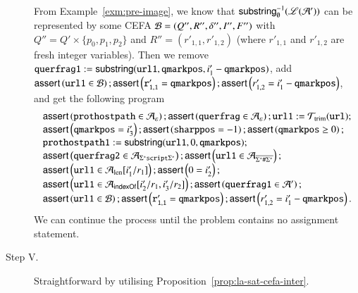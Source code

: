 \begin{example}
\begin{description}
From Example~\ref{exm:pre-image}, we know that $\mathsf{substring}^{-1}_\emptyset(\mathscr{L}(\mathcal{A}'))$ can be represented by some CEFA $\mathcal{B}=(Q'', R'', \delta'', I'', F'')$ with $Q''= Q' \times \{p_0,p_1,p_2\}$ and $R''=(r'_{1,1}, r'_{1,2})$ (where $r'_{1,1}$ and $r'_{1,2}$ are fresh integer variables). Then we remove $\mathtt{querfrag1} := \mathsf{substring}(\mathtt{url1, qmarkpos}, i'_1 - \mathtt{qmarkpos})$, add $\textsf{assert}\left(\mathtt{url1} \in \mathcal{B}\right);\textsf{assert}\left(\mathtt{r'_{1,1}= qmarkpos}\right); \textsf{assert}\left(r'_{1,2}=i'_1 - \mathtt{qmarkpos}\right)$, and get the following program
\[ 
\begin{array}{l}
    \textsf{assert}\left(\mathtt{prothostpath} \in \mathcal{A}_\varepsilon\right); \textsf{assert}\left(\mathtt{querfrag} \in \mathcal{A}_\varepsilon\right); \mathtt{url1} := \mathcal{T}_{\rm trim}(\mathtt{url}); \\
    \textsf{assert}\left(\mathtt{qmarkpos} = i'_3\right); \textsf{assert}\left(\mathtt{sharppos} =-1 \right); \textsf{assert}\left(\mathtt{qmarkpos} \ge 0\right); \\ 
    \mathtt{prothostpath1} := \mathsf{substring}(\mathtt{url1}, 0, \mathtt{qmarkpos});\\
    \textsf{assert}\left(\mathtt{querfrag2} \in  \mathcal{A}_{\Sigma^*\mathtt{script}\Sigma^*}\right);  
    \textsf{assert}\left(\mathtt{url1} \in  \mathcal{A}_{\overline{\Sigma^*\#\Sigma^*}}\right); \\
    \textsf{assert}\left(\mathtt{url1} \in \mathcal{A}_{\rm len}[i'_1/r_1]\right);  \textsf{assert}\left(0= i'_2\right); \\
    \textsf{assert}\left(\mathtt{url1} \in \mathcal{A}_{\mathsf{indexOf}}[i'_2/r_1, i'_3/r_2]\right);  \textsf{assert}\left(\mathtt{querfrag1} \in \mathcal{A}'\right);\\
    \textsf{assert}\left(\mathtt{url1} \in \mathcal{B}\right);\textsf{assert}\left(\mathtt{r'_{1,1} = qmarkpos} \right); \textsf{assert}\left(r'_{1,2}=i'_1 - \mathtt{qmarkpos}\right).
\end{array}
\]
We can continue the process until the problem contains no assignment statement.
%
\item[Step V.]  Straightforward by utilising Proposition~\ref{prop:la-sat-cefa-inter}. 
\end{description}

\end{example}




